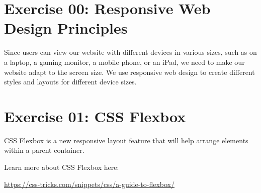 \documentclass{42-en}
\begin{document}

\chapter{Exercise 00: Responsive Web Design Principles}

\exnumber{\exercicenumber}

\makeheaderfiles

Since users can view our website with different devices in various sizes, such as on a laptop, a gaming monitor, a mobile phone, or an iPad, we need to make our website adapt to the screen size. We use responsive web design to create different styles and layouts for different device sizes.


\chapter{Exercise 01: CSS Flexbox}

\exnumber{\exercicenumber}

\makeheaderfiles

CSS Flexbox is a new responsive layout feature that will help arrange elements within a parent container.\par
\vspace{.2in}
Learn more about CSS Flexbox here: \par
\url{https://css-tricks.com/snippets/css/a-guide-to-flexbox/}
\end{document}
